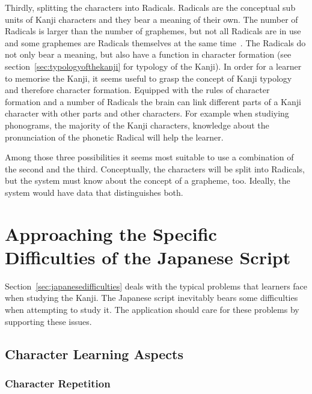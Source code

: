 Thirdly, splitting the characters into Radicals. Radicals are the conceptual 
sub units of Kanji characters and they bear a meaning of their 
own. The number of Radicals is larger than the number of graphemes, but not all 
Radicals are in use and some graphemes are Radicals themselves at the same 
time~.
The Radicals do not only bear a meaning, but also have a function in character
formation (see section~\ref{sec:typologyofthekanji} for typology of the Kanji).
In order for a learner to memorise the Kanji, it seems useful to grasp the 
concept of Kanji typology and therefore character formation.
Equipped with the rules of character formation and a number of Radicals the
brain can link different parts of a Kanji character with other parts and 
other characters. For example when studiying phonograms, the majority of the
Kanji characters, knowledge about the pronunciation of the phonetic Radical
will help the learner.

Among those three possibilities it seems most suitable to use a combination of 
the second and the third. Conceptually, the characters will be split into 
Radicals, but the system must know about the concept of a grapheme, too.
Ideally, the system would have data that distinguishes both.

\section{Approaching the Specific Difficulties of the Japanese Script}
\label{sec:concept:tacklingdifficulties}

Section~\ref{sec:japanesedifficulties} deals with the typical problems that 
learners face when studying the Kanji. The Japanese script inevitably bears some 
difficulties when attempting to study it.
The application should care for these problems by supporting these issues.

\subsection{Character Learning Aspects}
\label{sec:concept:charaterlearningaspects}





\subsubsection{Character Repetition}
\label{sec:concept:characterrepetition} %

